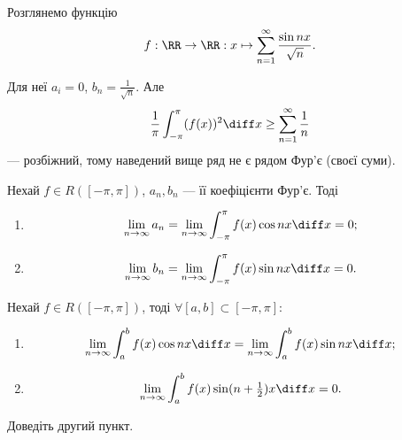 \begin{example}
    Розглянемо функцію
    \begin{equation}
        f: \RR \to \RR: x \mapsto \sum_{n = 1}^\infty \frac{\sin n x}{\sqrt{n}}.
    \end{equation}
    
    Для неї $a_i = 0$, $b_n = \frac{1}{\sqrt{n}}$. Але 
    \begin{equation}
        \frac{1}{\pi} \int_{-\pi}^\pi (f(x))^2 \diff x \ge \sum_{n = 1}^\infty \frac{1}{n}
    \end{equation}
    --- розбіжний, тому наведений вище ряд не є рядом Фур'є (своєї суми).
\end{example}

\begin{corollary}
    Нехай $f \in R([-\pi,\pi])$, $a_n, b_n$ --- її коефіцієнти Фур'є. Тоді
    \begin{enumerate}
        \item \begin{equation}
            \lim_{n \to \infty} a_n = \lim_{n \to \infty} \int_{-\pi}^\pi f(x) \cos n x \diff x = 0;
        \end{equation}
        \item \begin{equation}
            \lim_{n \to \infty} b_n = \lim_{n \to \infty} \int_{-\pi}^\pi f(x) \sin n x \diff x = 0.
        \end{equation}
    \end{enumerate}
\end{corollary}

\begin{corollary}
    Нехай $f \in R([-\pi,\pi])$, тоді $\forall [a, b] \subset [-\pi,\pi]$:
    \begin{enumerate}
        \item \begin{equation}
            \lim_{n \to \infty} \int_a^b f(x) \cos n x \diff x = \lim_{n \to \infty} \int_a^b f(x) \sin n x \diff x;
        \end{equation}
        \item \begin{equation}
             \lim_{n \to \infty} \int_a^b f(x) \sin (n + \tfrac{1}{2}) x \diff x = 0.
        \end{equation}
    \end{enumerate}
\end{corollary}
\begin{exercise}
    Доведіть другий пункт.            
\end{exercise}

